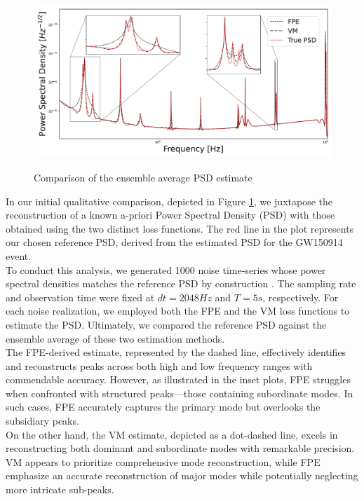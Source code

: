 \documentclass{aa}
\begin{document}
\begin{figure}
	\centering
	\includegraphics[width = \linewidth]{Images/Plots/comparison_loss2}
	\label{fig:psd_comparison}
	\caption{Comparison of the ensemble average PSD estimate}
\end{figure}
In our initial qualitative comparison, depicted in Figure \ref{fig:psd_comparison}, we juxtapose the reconstruction of a known a-priori Power Spectral Density (PSD) with those obtained using the two distinct loss functions. The red line in the plot represents our chosen reference PSD, derived from the estimated PSD for the GW150914 event.\\ 
To conduct this analysis, we generated 1000 noise time-series whose power spectral densities matches the reference PSD by construction \citet{noiseGen}. The sampling rate and observation time were fixed at $dt = 2048 Hz$ and $T = 5s$, respectively. For each noise realization, we employed both the FPE and the VM loss functions to estimate the PSD. Ultimately, we compared the reference PSD against the ensemble average of these two estimation methods.\\
The FPE-derived estimate, represented by the dashed line, effectively identifies and reconstructs peaks across both high and low frequency ranges with commendable accuracy. However, as illustrated in the inset plots, FPE struggles when confronted with structured peaks—those containing subordinate modes. In such cases, FPE accurately captures the primary mode but overlooks the subsidiary peaks. \\ 
On the other hand, the VM estimate, depicted as a dot-dashed line, excels in reconstructing both dominant and subordinate modes with remarkable precision. VM appears to prioritize comprehensive mode reconstruction, while FPE emphasize an accurate reconstruction of major modes while potentially neglecting more intricate sub-peaks.
\end{document}

